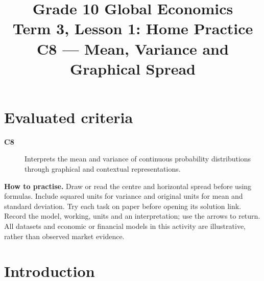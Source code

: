 \makeatletter
{}
\makeatother




\newcommand{\PracticeDensity}[9]{\begingroup\colorlet{blue}{black}\CompactDensityCoordinatesGraph{#1}{#2}{#3}{#4}{#5}{#6}{#7}{#8}{#9}\endgroup}

\title{Grade 10 Global Economics\\Term 3, Lesson 1: Home Practice\\C8 --- Mean, Variance and Graphical Spread}
\author{}
\date{}

\maketitle
\setcounter{tocdepth}{1}
\setcounter{secnumdepth}{2}
\label{toc}
\tableofcontents
\section*{Evaluated criteria}
\begin{description}
\item[\textbf{C8}] Interprets the mean and variance of continuous probability distributions through graphical and contextual representations.
\end{description}
\textbf{How to practise.} Draw or read the centre and horizontal spread before using formulas. Include squared units for variance and original units for mean and standard deviation. Try each task on paper before opening its solution link. Record the model, working, units and an interpretation; use the arrows to return.
All datasets and economic or financial models in this activity are illustrative, rather than observed market evidence.

\clearpage
\section{Introduction}\label{sec:introduction}
